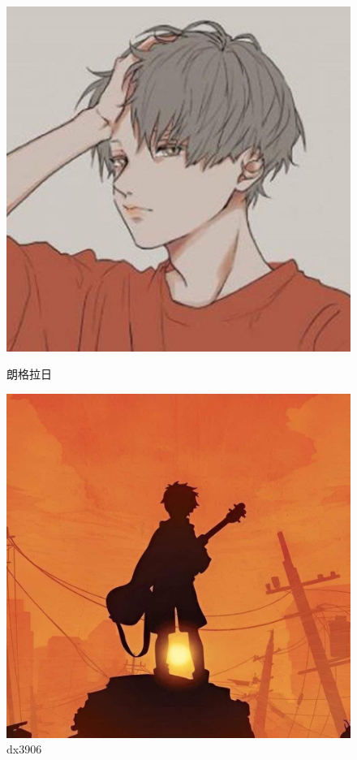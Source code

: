 \documentclass[a4paper]{article}  %
\begin{document}
\begin{figure}[htbp]
	\begin{minipage}{0.49\linewidth}
		\centering
		\includegraphics[width=0.9\linewidth]{contents/rsa4.jpg}
		\caption{朗格拉日}
		\label{Lagrange} %
	\end{minipage}
	\begin{minipage}{0.49\linewidth}
		\centering
		\includegraphics[width=0.9\linewidth]{contents/rsa5.jpg}
		\caption{dx3906}
		\label{dx906999} %
	\end{minipage}
\end{figure}
\end{document}
